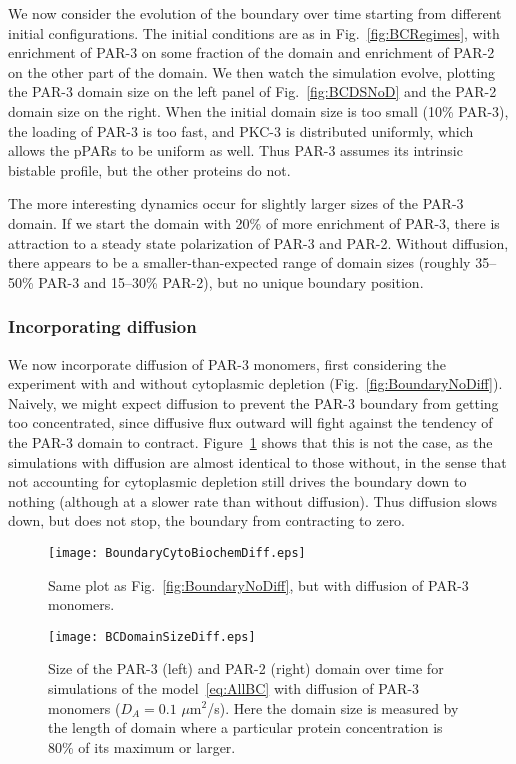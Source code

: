 \documentclass[11pt]{article}
\newcommand{\6}[1]{#1_{\text{6}}}
\newcommand{\3}[1]{#1_{\text{3}}}
\begin{document}
We now consider the evolution of the boundary over time starting from different initial configurations. The initial conditions are as in Fig.\ \ref{fig:BCRegimes}, with enrichment of PAR-3 on some fraction of the domain and enrichment of PAR-2 on the other part of the domain. We then watch the simulation evolve, plotting the PAR-3 domain size on the left panel of Fig.\ \ref{fig:BCDSNoD} and the PAR-2 domain size on the right. When the initial domain size is too small (10\% PAR-3), the loading of PAR-3 is too fast, and PKC-3 is distributed uniformly, which allows the pPARs to be uniform as well. Thus PAR-3 assumes its intrinsic bistable profile, but the other proteins do not.

The more interesting dynamics occur for slightly larger sizes of the PAR-3 domain. If we start the domain with 20\% of more enrichment of PAR-3, there is attraction to a steady state polarization of PAR-3 and PAR-2. Without diffusion, there appears to be a smaller-than-expected range of domain sizes (roughly 35--50\% PAR-3 and 15--30\% PAR-2), but no unique boundary position.


\subsubsection{Incorporating diffusion}
We now incorporate diffusion of PAR-3 monomers, first considering the experiment with and without cytoplasmic depletion (Fig.\ \ref{fig:BoundaryNoDiff}). Naively, we might expect diffusion to prevent the PAR-3 boundary from getting too concentrated, since diffusive flux outward will fight against the tendency of the PAR-3 domain to contract. Figure\ \ref{fig:BoundaryDiff} shows that this is not the case, as the simulations with diffusion are almost identical to those without, in the sense that not accounting for cytoplasmic depletion still drives the boundary down to nothing (although at a slower rate than without diffusion). Thus diffusion slows down, but does not stop, the boundary from contracting to zero. 

\begin{figure}
\centering
\texttt{[image: BoundaryCytoBiochemDiff.eps]}
\caption{\label{fig:BoundaryDiff}Same plot as Fig.\ \ref{fig:BoundaryNoDiff}, but with diffusion of PAR-3 monomers. }
\end{figure}

\begin{figure}
\centering
\texttt{[image: BCDomainSizeDiff.eps]}
\caption{\label{fig:BCDSD} Size of the PAR-3 (left) and PAR-2 (right) domain over time for simulations of the model\ \eqref{eq:AllBC} with diffusion of PAR-3 monomers ($D_A=0.1$ $\mu$m$^2$/s). Here the domain size is measured by the length of domain where a particular protein concentration is 80\% of its maximum or larger. }
\end{figure}
\end{document}
